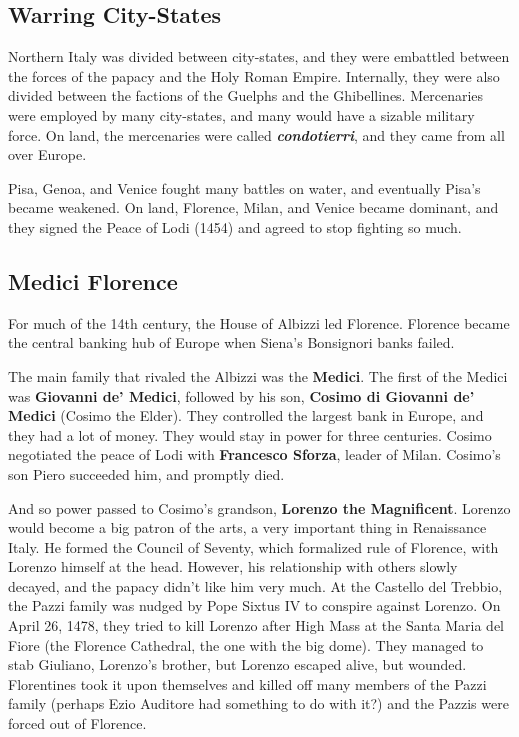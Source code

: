 \subsection*{Warring City-States}

Northern Italy was divided between city-states,
and they were embattled between the forces of the papacy and the Holy Roman Empire.
Internally, they were also divided between the factions of the Guelphs and the Ghibellines.
Mercenaries were employed by many city-states, and many would have a sizable military force.
On land, the mercenaries were called \textit{\textbf{condotierri}}, and they came from all over Europe.

Pisa, Genoa, and Venice fought many battles on water, and eventually Pisa's became weakened.
On land, Florence, Milan, and Venice became dominant,
and they signed the Peace of Lodi (1454) and agreed to stop fighting so much.

\subsection*{Medici Florence}

For much of the 14th century, the House of Albizzi led Florence.
Florence became the central banking hub of Europe when Siena's Bonsignori banks failed.

The main family that rivaled the Albizzi was the \textbf{Medici}.
The first of the Medici was \textbf{Giovanni de' Medici},
followed by his son, \textbf{Cosimo di Giovanni de' Medici} (Cosimo the Elder).
They controlled the largest bank in Europe, and they had a lot of money.
They would stay in power for three centuries.
Cosimo negotiated the peace of Lodi with \textbf{Francesco Sforza}, leader of Milan.
Cosimo's son Piero succeeded him, and promptly died.

And so power passed to Cosimo's grandson, \textbf{Lorenzo the Magnificent}.
Lorenzo would become a big patron of the arts, a very important thing in Renaissance Italy.
He formed the Council of Seventy, which formalized rule of Florence, with Lorenzo himself at the head.
However, his relationship with others slowly decayed, and the papacy didn't like him very much.
At the Castello del Trebbio, the Pazzi family was nudged by Pope Sixtus IV to conspire against Lorenzo.
On April 26, 1478, they tried to kill Lorenzo after High Mass at the Santa Maria del Fiore
(the Florence Cathedral, the one with the big dome).
They managed to stab Giuliano, Lorenzo's brother, but Lorenzo escaped alive, but wounded.
Florentines took it upon themselves and killed off many members of the Pazzi family
(perhaps Ezio Auditore had something to do with it?)
and the Pazzis were forced out of Florence.

